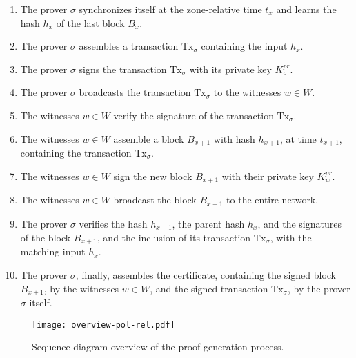 \begin{enumerate}
    \item The prover $\sigma$ synchronizes itself at the zone-relative time $t_x$ and learns the hash  $h_x$ of the last block $B_{x}$.
    \item The prover $\sigma$ assembles a transaction $\text{Tx}_\sigma$ containing the input $h_x$.
    \item The prover $\sigma$ signs the transaction $\text{Tx}_\sigma$ with its private key $K^{pr}_\sigma$.
    \item The prover $\sigma$ broadcasts the transaction $\text{Tx}_\sigma$ to the witnesses $w \in W$.
    \item The witnesses $w \in W$ verify the signature of the transaction $\text{Tx}_\sigma$.
    \item The witnesses $w \in W$ assemble a block $B_{x+1}$ with hash $h_{x+1}$, at time $t_{x+1}$, containing the transaction $\text{Tx}_\sigma$.
    \item The witnesses $w \in W$ sign the new block $B_{x+1}$ with their private key $K^{pr}_w$.
    \item The witnesses $w \in W$ broadcast the block $B_{x+1}$ to the entire network.
    \item The prover $\sigma$ verifies the hash $h_{x+1}$, the parent hash $h_{x}$, and the signatures of the block $B_{x+1}$, and the inclusion of its transaction $\text{Tx}_\sigma$, with the matching input $h_{x}$.
    \item The prover $\sigma$, finally, assembles the \pol{} certificate, containing the signed block $B_{x+1}$, by the witnesses $w \in W$, and the signed transaction $\text{Tx}_\sigma$, by the prover $\sigma$ itself.
\end{enumerate}

\begin{figure}[ht]
    \begin{center}
    \texttt{[image: overview-pol-rel.pdf]}
    \caption{Sequence diagram overview of the proof generation process.}
    \label{fig:proof-of-location-overview-relative-pol}
    \end{center}
\end{figure}

